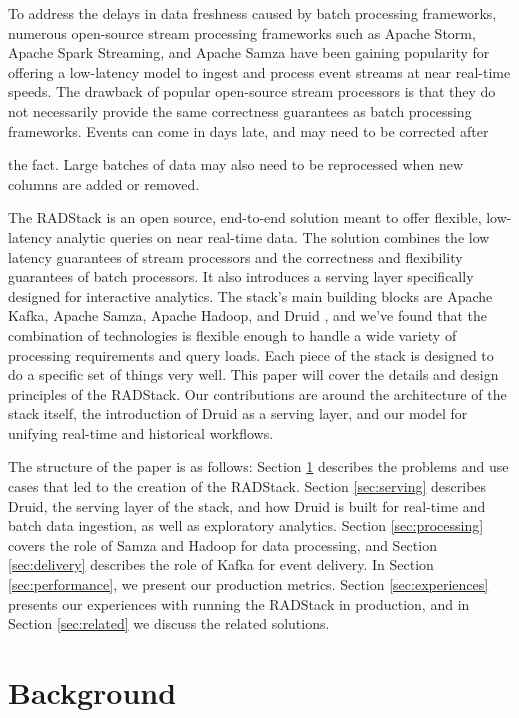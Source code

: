 \documentclass{vldb}
\begin{document}
To address the delays in data freshness caused by batch processing
frameworks, numerous open-source stream processing frameworks such as Apache
Storm\cite{marz2013storm}, Apache Spark Streaming\cite{zaharia2012discretized},
and Apache Samza\cite{2014samza} have been gaining popularity for offering a
low-latency model to ingest and process event streams at near real-time speeds.
The drawback of popular open-source stream processors is that they do not
necessarily provide the same correctness guarantees as batch processing
frameworks. Events can come in days late, and may need to be corrected after
{the fact. Large batches of data may also need to be reprocessed when new
columns are added or removed.

The RADStack is an open source, end-to-end solution meant to offer flexible,
low-latency analytic queries on near real-time data. The solution combines the
low latency guarantees of stream processors and the correctness and flexibility
guarantees of batch processors. It also introduces a serving layer specifically
designed for interactive analytics. The stack’s main building blocks are Apache
Kafka\cite{kreps2011kafka}, Apache Samza, Apache Hadoop, and Druid
\cite{yang2014druid}, and we’ve found that the combination of technologies is
flexible enough to handle a wide variety of processing requirements and query
loads. Each piece of the stack is designed to do a specific set of things very
well. This paper will cover the details and design principles of the RADStack.
Our contributions are around the architecture of the stack itself, the
introduction of Druid as a serving layer, and our model for unifying real-time
and historical workflows.

The structure of the paper is as follows: Section \ref{sec:background}
describes the problems and use cases that led to the creation of the RADStack.
Section \ref{sec:serving} describes Druid, the serving layer of the stack, and
how Druid is built for real-time and batch data ingestion, as well as
exploratory analytics. Section \ref{sec:processing} covers the role of Samza
and Hadoop for data processing, and Section \ref{sec:delivery} describes the
role of Kafka for event delivery. In Section \ref{sec:performance}, we present
our production metrics.  Section \ref{sec:experiences} presents our experiences
with running the RADStack in production, and in Section \ref{sec:related} we
discuss the related solutions.

\section{Background}
\label{sec:background}

}
\end{document}
